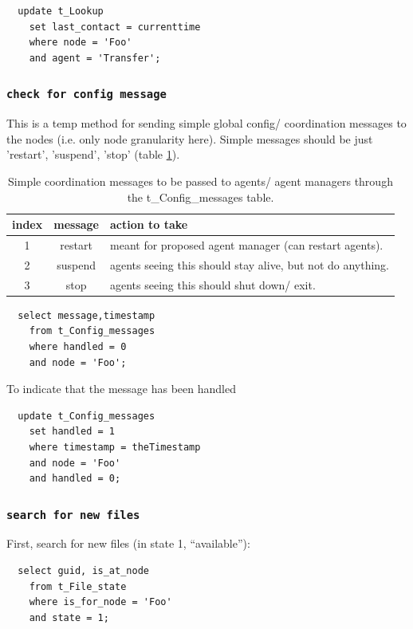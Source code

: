 \documentclass{cmspaper}
\begin{document}
{\small\begin{verbatim}
  update t_Lookup
    set last_contact = currenttime
    where node = 'Foo'
    and agent = 'Transfer';
\end{verbatim}}

\subsubsection{\textbf{\texttt{check for config message}}}
This is a temp method for sending simple global config/ coordination messages to the nodes (i.e. only node granularity here). Simple messages should be just 'restart', 'suspend', 'stop' (table \ref{table:messages}).

\begin{table}
\centering
\begin{tabular}[!h]{|c|c|l|} 
\hline index & message & action to take
\\ \hline
	1 & restart & meant for proposed agent manager (can restart agents).
\\	2 & suspend & agents seeing this should stay alive, but not do anything.
\\	3 & stop & agents seeing this should shut down/ exit.
\\ \hline
\end{tabular}
\caption{Simple coordination messages to be passed to agents/ agent managers through the t\_Config\_messages table.}
\label{table:messages}
\end{table}

{\small\begin{verbatim}
  select message,timestamp
  	from t_Config_messages
  	where handled = 0
  	and node = 'Foo';
\end{verbatim}}

To indicate that the message has been handled

{\small\begin{verbatim}
  update t_Config_messages
  	set handled = 1
  	where timestamp = theTimestamp
  	and node = 'Foo'
  	and handled = 0;
\end{verbatim}}

\subsubsection{\textbf{\texttt{search for new files}}}
First, search for new files (in state 1, ``available''):

{\small\begin{verbatim}
  select guid, is_at_node
    from t_File_state
    where is_for_node = 'Foo'
    and state = 1;
\end{verbatim}}
\end{document}
